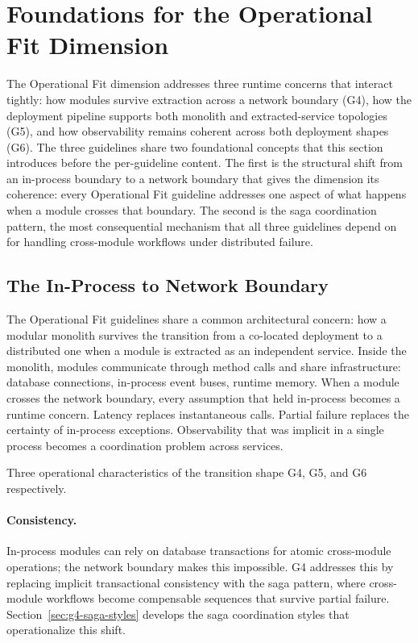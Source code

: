 \pagebreak
\section{Foundations for the Operational Fit Dimension}
\label{sec:foundations-operational-fit}

The Operational Fit dimension addresses three runtime concerns that interact tightly: how modules survive extraction across a network boundary (G4), how the deployment pipeline supports both monolith and extracted-service topologies (G5), and how observability remains coherent across both deployment shapes (G6). The three guidelines share two foundational concepts that this section introduces before the per-guideline content. The first is the structural shift from an in-process boundary to a network boundary that gives the dimension its coherence: every Operational Fit guideline addresses one aspect of what happens when a module crosses that boundary. The second is the saga coordination pattern, the most consequential mechanism that all three guidelines depend on for handling cross-module workflows under distributed failure.

\subsection*{The In-Process to Network Boundary}
\label{sec:foundations-op-fit-network-boundary}

The Operational Fit guidelines share a common architectural concern: how a modular monolith survives the transition from a co-located deployment to a distributed one when a module is extracted as an independent service. Inside the monolith, modules communicate through method calls and share infrastructure: database connections, in-process event buses, runtime memory. When a module crosses the network boundary, every assumption that held in-process becomes a runtime concern. Latency replaces instantaneous calls. Partial failure replaces the certainty of in-process exceptions. Observability that was implicit in a single process becomes a coordination problem across services.

Three operational characteristics of the transition shape G4, G5, and G6 respectively.

\paragraph*{Consistency.} In-process modules can rely on database transactions for atomic cross-module operations; the network boundary makes this impossible. G4 addresses this by replacing implicit transactional consistency with the saga pattern, where cross-module workflows become compensable sequences that survive partial failure. Section~\ref{sec:g4-saga-styles} develops the saga coordination styles that operationalize this shift.

